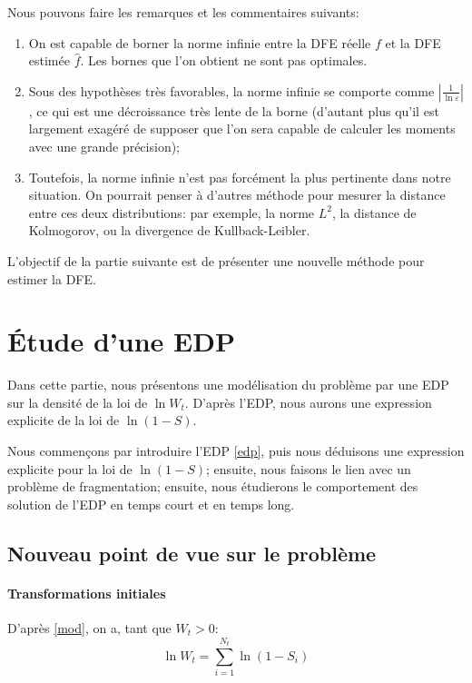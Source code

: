 \documentclass[12pt]{article}
\newcommand{\abs}[1]{\left|#1\right|}
\begin{document}
Nous pouvons faire les remarques et les commentaires suivants:
\begin{enumerate}
\item On est capable de borner la norme infinie entre la DFE réelle $f$ et la DFE estimée $\hat{f}$. Les bornes que l'on obtient ne sont pas optimales.
\item Sous des hypothèses très favorables, la norme infinie se comporte comme $\abs{\frac{1}{\ln\varepsilon}}$, ce qui est une décroissance très lente de la borne (d'autant plus qu'il est largement exagéré de supposer que l'on sera capable de calculer les moments avec une grande précision);
\item Toutefois, la norme infinie n'est pas forcément la plus pertinente dans notre situation. On pourrait penser à d'autres méthode pour mesurer la distance entre ces deux distributions: par exemple, la norme $L^2$, la distance de Kolmogorov, ou la divergence de Kullback-Leibler.
\end{enumerate}

L'objectif de la partie suivante est de présenter une nouvelle méthode pour estimer la DFE.


\FloatBarrier
\section{Étude d'une EDP}

Dans cette partie, nous présentons une modélisation du problème par une EDP sur la densité de la loi de $\ln W_t$. D'après l'EDP, nous aurons une expression explicite de la loi de $\ln (1-S)$.

Nous commençons par introduire l'EDP \eqref{edp}, puis nous déduisons une expression explicite pour la loi de $\ln(1-S)$; ensuite, nous faisons le lien avec un problème de fragmentation; ensuite, nous étudierons le comportement des solution de l'EDP en temps court et en temps long.

\subsection{Nouveau point de vue sur le problème}

\paragraph{Transformations initiales}

D'après \eqref{mod}, on a, tant que $W_t>0$: \[\ln W_t=\sum_{i=1}^{N_t}\ln(1-S_i)\]
\end{document}
